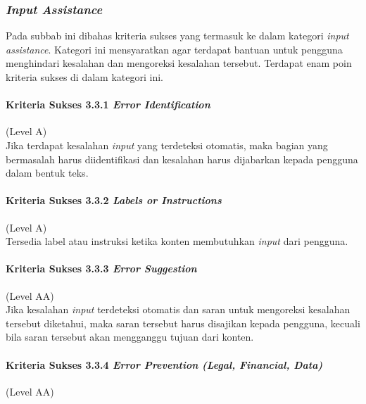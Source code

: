 \subsubsection{\textit{Input Assistance}}
\label{sec:input_assistance}
Pada subbab ini dibahas kriteria sukses yang termasuk ke dalam kategori \textit{input assistance}. Kategori ini mensyaratkan agar terdapat bantuan untuk pengguna menghindari kesalahan dan mengoreksi kesalahan tersebut. Terdapat enam poin kriteria sukses di dalam kategori ini.

\paragraph{Kriteria Sukses 3.3.1 \textit{Error Identification}}
\label{sec:kriteria_sukses_3.3.1}
(Level A)\\

Jika terdapat kesalahan \textit{input} yang terdeteksi otomatis, maka bagian yang bermasalah harus diidentifikasi dan kesalahan harus dijabarkan kepada pengguna dalam bentuk teks.

\paragraph{Kriteria Sukses 3.3.2 \textit{Labels or Instructions}}
\label{sec:kriteria_sukses_3.3.2}
(Level A)\\

Tersedia label atau instruksi ketika konten membutuhkan \textit{input} dari pengguna.

\paragraph{Kriteria Sukses 3.3.3 \textit{Error Suggestion}}
\label{sec:kriteria_sukses_3.3.3}
(Level AA)\\

Jika kesalahan \textit{input} terdeteksi otomatis dan saran untuk mengoreksi kesalahan tersebut diketahui, maka saran tersebut harus disajikan kepada pengguna, kecuali bila saran tersebut akan mengganggu tujuan dari konten.

\paragraph{Kriteria Sukses 3.3.4 \textit{Error Prevention (Legal, Financial, Data)}}
\label{sec:kriteria_sukses_3.3.4}
(Level AA)\\


